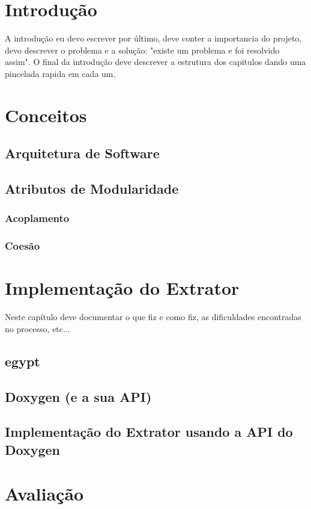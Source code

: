 \chapter{Introdução}

A introdução eu devo escrever por último, deve conter a importancia do projeto, devo descrever o problema e a solução: "existe um problema e foi resolvido assim". O final da introdução deve descrever a estrutura dos capitulos dando uma pincelada rapida em cada um.

\chapter{Conceitos}
\section{Arquitetura de Software}
\section{Atributos de Modularidade}
\subsection{Acoplamento}
\subsection{Coesão}

\chapter{Implementação do Extrator}

Neste capítulo deve documentar o que fiz e como fiz, as dificuldades encontradas no processo, etc...
\section{egypt}
\section{Doxygen (e a sua API)}
\section{Implementação do Extrator usando a API do Doxygen}

\chapter{Avaliação}
